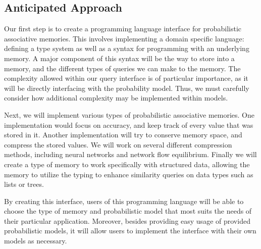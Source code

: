 \documentclass{sig-alternate}
\begin{document}
\subsection{Anticipated Approach}
\label{subsec:approach}

Our first step is to create a programming language interface for probabilistic
associative memories. This involves implementing a domain specific language: 
defining a type system as well as a syntax for programming with an underlying memory.
A major component of this syntax will be the way to store into a memory, 
and the different types of queries we can make to the memory. The complexity allowed
within our query interface is of particular importance, as it will be directly
interfacing with the probability model. Thus, we must carefully consider 
how additional complexity may be implemented within models. 

Next, we will implement various types of probabilistic associative memories.
One implementation would focus on accuracy, and keep track of every value that
was stored in it. Another implementation will try to conserve memory space,
and compress the stored values. We will work on several different compression methods,
including neural networks and network flow equilibrium. Finally we will create
a type of memory to work specifically with structured data, allowing the memory
to utilize the typing to enhance similarity queries on data types such as lists or trees.

By creating this interface, users of this programming language will be able to
choose the type of memory and probabilistic model that most suits the needs of their particular
application. Moreover, besides providing easy usage of provided probabilistic models, 
it will allow users to implement the interface with their own models as necessary. 
\end{document}
